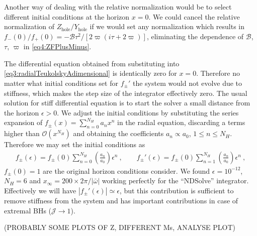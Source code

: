 Another way of dealing with the relative normalization would be to select different initial conditions at the horizon $x=0$.
We could cancel the relative normalization of $Z_\mathrm{hole}/Y_\mathrm{hole}$ if we would set any normalization which results in $f_{-}(0)/f_{+}(0) = -\mathscr{B} \tau^2 /[2 \varpi (i \tau + 2 \varpi)]$, eliminating the dependence of $\mathscr{B}$, $\tau$, $\varpi$ in \eqref{eq4:ZFPlusMinus}.

The differential equation obtained from substituting  into \eqref{eq3:radialTeukolskyAdimensional} is identically zero for $x=0$.
Therefore no matter what initial conditions set for $f_{\pm}{\!}'$ the system would not evolve due to stiffness, which makes the step size of the integrator effectively zero.
The usual solution for stiff differential equation is to start the solver a small distance from the horizon $\epsilon>0$.
We adjust the initial conditions by substituting the series expansion of $f_{\pm}(x) = \sum_{n=0}^{N_H} a_n x^n$ in the radial equation, discarding a terms higher than $\mathscr{O}(x^{N_H})$ and obtaining the coefficients $a_n \propto a_0$, $1 \le n \le N_H$. 
Therefore we may set the initial conditions as
\begin{align}
	f_{\pm}(\epsilon) = f_{\pm}(0) \sum_{n=0}^{N_H} \left(\frac{a_n}{a_0}\right) \epsilon^n ~,\qquad f_{\pm}{\!}'(\epsilon) = f_{\pm}(0) \sum_{n=1}^{N_H} \left(\frac{a_n}{a_0}\right) \epsilon^n ~,
\end{align}
$f_{\pm}(0)=1$ are the original horizon conditions consider.
We found $\epsilon=10^{-12}$, $N_H=6$ and $x_\infty = 200 \times 2\pi/|\bar{\omega}|$ working perfectly for the ``NDSolve'' integrator.
Effectively we will have $|f_{\pm}{\!}'(\epsilon)|\simeq \epsilon$, but this contribution is sufficient to remove stiffness from the system and has important contributions in case of extremal BHs ($\mathscr{J}\to 1$).

(PROBABLY SOME PLOTS OF Z, DIFFERENT Ms, ANALYSE PLOT)

